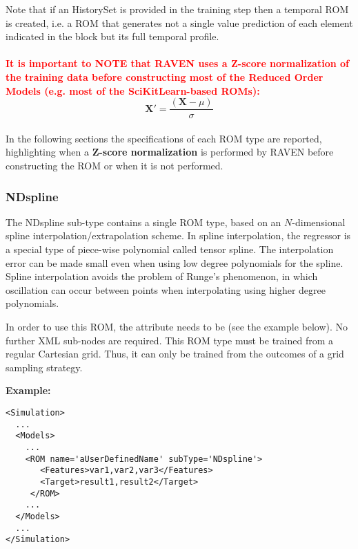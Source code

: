 %
Note that if an HistorySet is provided in the training step then a temporal ROM is created, i.e. a ROM that generates not a single value prediction of each element indicated in the   block but its full temporal profile.
\\
\textcolor{red}{\\\textbf{It is important to NOTE that RAVEN uses a Z-score normalization of the training data before constructing most of the
Reduced Order Models (e.g. most of the SciKitLearn-based ROMs):}}
\begin{equation}
  \mathit{\mathbf{X'}} = \frac{(\mathit{\mathbf{X}}-\mu )}{\sigma }
\end{equation}
\\In the following sections the specifications of each ROM type are reported, highlighting when a \textbf{Z-score normalization} is performed by RAVEN before constructing the ROM or when it is not performed.

%
\subsubsection{NDspline}
\label{subsubsec:NDspline}
The NDspline sub-type contains a single ROM type, based on an $N$-dimensional
spline interpolation/extrapolation scheme.
%
In spline interpolation, the regressor is a special type of piece-wise
polynomial called tensor spline.
%
The interpolation error can be made small even when using low degree polynomials
for the spline.
%
Spline interpolation avoids the problem of Runge's phenomenon, in which
oscillation can occur between points when interpolating using higher degree
polynomials.
%

In order to use this ROM, the  attribute  needs to
be  (see the example below).
%
No further XML sub-nodes are required.
%
\nb This ROM type must be trained from a regular Cartesian grid.
%
Thus, it can only be trained from the outcomes of a grid sampling strategy.


\textbf{Example:}
\begin{lstlisting}[style=XML,morekeywords={name,subType}]
<Simulation>
  ...
  <Models>
    ...
    <ROM name='aUserDefinedName' subType='NDspline'>
       <Features>var1,var2,var3</Features>
       <Target>result1,result2</Target>
     </ROM>
    ...
  </Models>
  ...
</Simulation>
\end{lstlisting}


